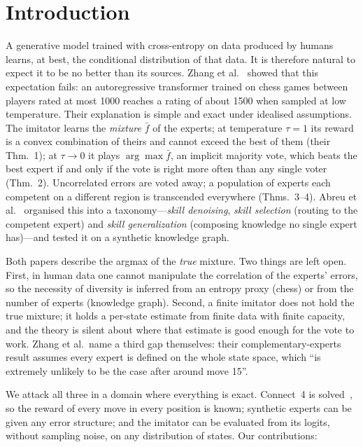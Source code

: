 \documentclass[11pt]{article}
\newcommand{\tauz}{\tau\!\to\!0}
\begin{document}
\section{Introduction}

A generative model trained with cross-entropy on data produced by humans learns, at best, the conditional distribution of that data. It is therefore natural to expect it to be no better than its sources. Zhang et al.~\cite{zhang2024transcendence} showed that this expectation fails: an autoregressive transformer trained on chess games between players rated at most 1000 reaches a rating of about 1500 when sampled at low temperature. Their explanation is simple and exact under idealised assumptions. The imitator learns the \emph{mixture} $\bar f$ of the experts; at temperature $\tau=1$ its reward is a convex combination of theirs and cannot exceed the best of them (their Thm.~1); at $\tauz$ it plays $\arg\max\bar f$, an implicit majority vote, which beats the best expert if and only if the vote is right more often than any single voter (Thm.~2). Uncorrelated errors are voted away; a population of experts each competent on a different region is transcended everywhere (Thms.~3--4). Abreu et al.~\cite{abreu2025taxonomy} organised this into a taxonomy---\emph{skill denoising}, \emph{skill selection} (routing to the competent expert) and \emph{skill generalization} (composing knowledge no single expert has)---and tested it on a synthetic knowledge graph.

Both papers describe the argmax of the \emph{true} mixture. Two things are left open. First, in human data one cannot manipulate the correlation of the experts' errors, so the necessity of diversity is inferred from an entropy proxy (chess) or from the number of experts (knowledge graph). Second, a finite imitator does not hold the true mixture; it holds a per-state estimate from finite data with finite capacity, and the theory is silent about where that estimate is good enough for the vote to work. Zhang et al.\ name a third gap themselves: their complementary-experts result assumes every expert is defined on the whole state space, which ``is extremely unlikely to be the case after around move 15''.

We attack all three in a domain where everything is exact. Connect~4 is solved~\cite{allis1988,pons2019}, so the reward of every move in every position is known; synthetic experts can be given any error structure; and the imitator can be evaluated from its logits, without sampling noise, on any distribution of states. Our contributions:
\end{document}
